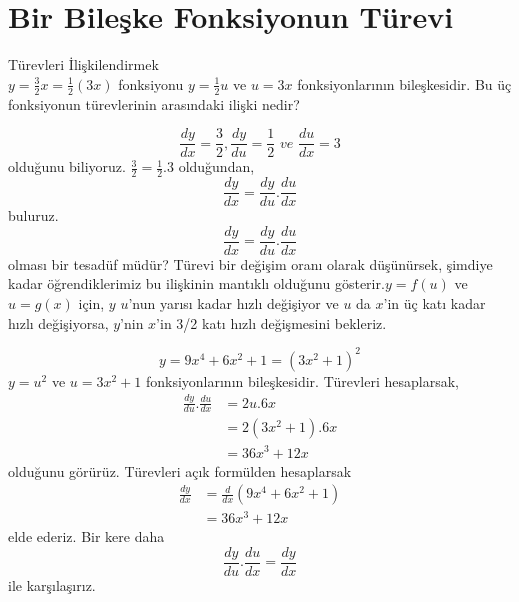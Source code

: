 \section{\protect Bir Bileşke Fonksiyonun Türevi}
\begin{ornek}Türevleri İlişkilendirmek\\
	$\displaystyle y=\frac{3}{2}x=\frac{1}{2}(3x)$ fonksiyonu $y=\frac{1}{2}u$ ve $u=3x$ fonksiyonlarının bileşkesidir. Bu üç fonksiyonun türevlerinin arasındaki ilişki nedir?
\end{ornek}
\begin{cozum}
	\begin{equation*}
	\frac{dy}{dx}=\frac{3}{2}, \frac{dy}{du}=\frac{1}{2} \textit{  ve  } \frac{du}{dx}=3
	\end{equation*}
olduğunu biliyoruz. $\displaystyle \frac{3}{2}=\frac{1}{2}.3$ olduğundan,
	\begin{equation*}
	\frac{dy}{dx}=\frac{dy}{du}.\frac{du}{dx}
	\end{equation*}
buluruz.
	\begin{equation*}
	\frac{dy}{dx}=\frac{dy}{du}.\frac{du}{dx}
	\end{equation*}
olması bir tesadüf müdür? Türevi bir değişim oranı olarak düşünürsek, şimdiye kadar öğrendiklerimiz bu ilişkinin mantıklı olduğunu gösterir.$y=f(u)$ ve $u=g(x)$ için, $y$ $u$'nun yarısı kadar hızlı değişiyor ve $u$ da $x$'in üç katı kadar hızlı değişiyorsa, $y$'nin $x$'in 3/2 katı hızlı değişmesini bekleriz. 
\end{cozum}
\begin{ornek}
	\begin{equation*}
	y=9x^4+6x^2+1=(3x^2+1)^2
	\end{equation*}
$y=u^2$ ve $u=3x^2+1$ fonksiyonlarının bileşkesidir. Türevleri hesaplarsak,
	\begin{equation*}
	\begin{split}
	\frac{dy}{du}.\frac{du}{dx}&=2u.6x\\
	&=2(3x^2+1).6x\\
	&=36x^3+12x
	\end{split}
	\end{equation*}
olduğunu görürüz. Türevleri açık formülden hesaplarsak
	\begin{equation*}
	\begin{split}
	\frac{dy}{dx}&=\frac{d}{dx}(9x^4+6x^2+1)\\
		&=36x^3+12x
	\end{split}
	\end{equation*}
elde ederiz. Bir kere daha
	\begin{equation*}
	\frac{dy}{du}.\frac{du}{dx}=\frac{dy}{dx}
	\end{equation*}
ile karşılaşırız.
\end{ornek}

